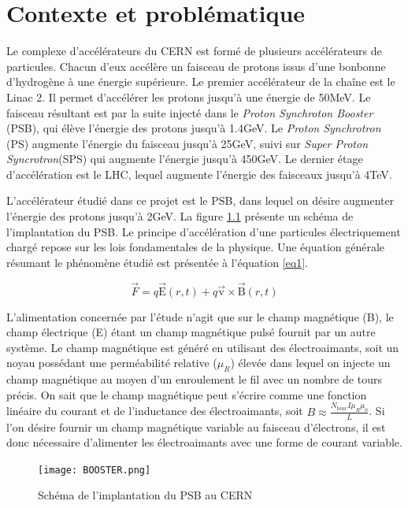\chapter{Contexte et problématique}
Le complexe d'accélérateurs du CERN est formé de plusieurs accélérateurs de particules. Chacun d'eux accélère un faisceau de protons issus d'une bonbonne d'hydrogène à une énergie supérieure. Le premier accélérateur de la chaîne est le Linac 2. Il permet d'accélérer les protons jusqu'à une énergie de 50MeV. Le faisceau résultant est par la suite injecté dans le \textit{Proton Synchroton Booster} (PSB), qui élève l'énergie des protons jusqu'à 1.4GeV. Le \textit{Proton Synchrotron} (PS) augmente l'énergie du faisceau jusqu'à 25GeV, suivi sur \textit{Super Proton Syncrotron}(SPS) qui augmente l'énergie jusqu'à 450GeV. Le dernier étage d'accélération est le LHC, lequel augmente l'énergie des faisceaux jusqu'à 4TeV. 

L'accélérateur étudié dans ce projet est le PSB, dans lequel on désire augmenter l'énergie des protons jusqu'à 2GeV.  La figure \ref{BOOSTER} présente un schéma de l'implantation du PSB. Le principe d'accélération d'une particules électriquement chargé repose sur les lois  fondamentales de la physique. Une équation générale résumant le phénomène étudié est présentée à l'équation \ref{eq1}.

\begin{equation}
\label{eq1}
\vec{F} = q\vec{\mbox{E}}(r,t) + q\vec{\mbox{v}}\times \vec{\mbox{B}}(r,t)
\end{equation}

L'alimentation concernée par l'étude n'agit que sur le champ magnétique (B), le champ électrique (E) étant un champ magnétique pulsé fournit par un autre système. Le champ magnétique est généré en utilisant des électroaimants, soit un noyau possédant une perméabilité relative ($\mu_R$) élevée dans lequel on injecte un champ magnétique au moyen d'un enroulement le fil avec un nombre de tours précis. On sait que le champ magnétique peut s'écrire comme une fonction linéaire du courant et de l'inductance des électroaimants, soit $B \approx \frac{N_{tour}I\mu_R \mu_0}{L}$. Si l'on désire fournir un champ magnétique variable au faisceau d'électrons, il est donc nécessaire d'alimenter les électroaimants avec une forme de courant variable. 

\begin{figure}[htb]
\centering
\texttt{[image: BOOSTER.png]}
\caption{Schéma de l'implantation du PSB au CERN}
\label{BOOSTER}
\end{figure}

